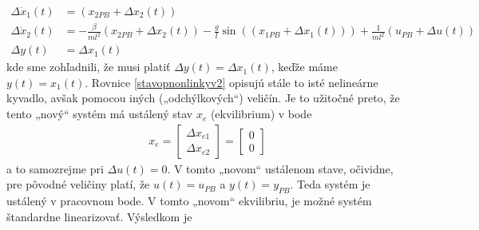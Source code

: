 \documentclass[a4paper, 10pt, ]{article}
\begin{document}
\begin{subequations} \label{stavopnonlinkyv2}
	\begin{align}
        \Delta \dot x_1(t) &= \left( x_{2PB} + \Delta x_2(t) \right) \\
        \Delta \dot x_2(t) &=
        - \frac{\beta}{ml^2} \left( x_{2PB} + \Delta x_2(t) \right) - \frac{g}{l} \sin\left( \left( x_{1PB} + \Delta x_1(t) \right) \right)
        + \frac{1}{ml^2} \left( u_{PB} + \Delta u(t) \right) \\
        \Delta y(t) &= \Delta x_1(t)
	\end{align}
\end{subequations}
kde sme zohľadnili, že musi platiť $\Delta y(t) = \Delta x_1(t)$, keďže máme $y(t) = x_1(t)$. Rovnice \eqref{stavopnonlinkyv2} opisujú stále to isté nelineárne kyvadlo, avšak pomocou iných („odchýlkových“) veličín. Je to užitočné preto, že tento „nový“ systém má ustálený stav $x_e$ (ekvilibrium) v bode
\begin{align}
    x_e =
    \begin{bmatrix}
        \Delta x_{e1}    \\
        \Delta x_{e2}
    \end{bmatrix}
    =
    \begin{bmatrix}
        0    \\
        0
    \end{bmatrix}
\end{align}
a to samozrejme pri $\Delta u(t) = 0$. V tomto „novom“ ustálenom stave, očividne, pre pôvodné veličiny platí, že $u(t)  =  u_{PB}$ a $y(t)  =  y_{PB}$. Teda systém je ustálený v pracovnom bode. V tomto „novom“ ekvilibriu, je možné systém štandardne linearizovať. Výsledkom je
\end{document}
